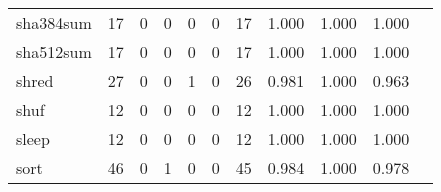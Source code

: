 \begin{longtable}{lp{1.2cm}p{1.2cm}p{1.2cm}p{1.2cm}p{1.2cm}p{1.2cm}p{1.2cm}p{1.2cm}p{1.2cm}p{1.2cm}}
sha384sum &                                    17 &                                                  0 &                                                  0 &                                                  0 &                                                  0 &                                                 17 &                                              1.000 &                                              1.000 &                                              1.000 \\
sha512sum &                                    17 &                                                  0 &                                                  0 &                                                  0 &                                                  0 &                                                 17 &                                              1.000 &                                              1.000 &                                              1.000 \\
shred     &                                    27 &                                                  0 &                                                  0 &                                                  1 &                                                  0 &                                                 26 &                                              0.981 &                                              1.000 &                                              0.963 \\
shuf      &                                    12 &                                                  0 &                                                  0 &                                                  0 &                                                  0 &                                                 12 &                                              1.000 &                                              1.000 &                                              1.000 \\
sleep     &                                    12 &                                                  0 &                                                  0 &                                                  0 &                                                  0 &                                                 12 &                                              1.000 &                                              1.000 &                                              1.000 \\
sort      &                                    46 &                                                  0 &                                                  1 &                                                  0 &                                                  0 &                                                 45 &                                              0.984 &                                              1.000 &                                              0.978 \\

\end{longtable}

